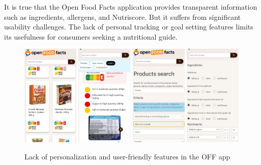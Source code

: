It is true that the Open Food Facts application provides transparent
information such as ingredients, allergens, and Nutriscore. But it suffers
from significant usability challenges. The lack of personal tracking or goal
setting features limits its usefulness for consumers seeking a nutritional
guide.
\begin{figure}[H]
    \centering
    \includegraphics[width=0.24\textwidth]{images/OFF-00.png}
    \includegraphics[width=0.24\textwidth]{images/OFF-01.png}
    \includegraphics[width=0.24\textwidth]{images/OFF-02.png}
    \includegraphics[width=0.24\textwidth]{images/OFF-03.png}
    \caption{Lack of personalization and user-friendly features in the OFF app}
    \label{fig:natilait_screenshots}
\end{figure}

